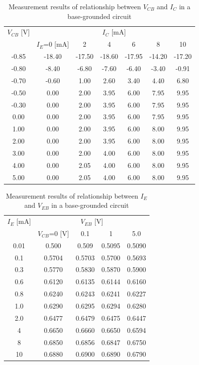 \documentclass[a4paper,10pt]{jsarticle}
\begin{document}
\begin{table}[H]
  \centering
  \caption{Measurement results of relationship between $V_{CB}$ and $I_C$ in a base-grounded circuit}
    \begin{tabular}{ccccccc}
    $V_{CB}$ [V] & \multicolumn{6}{c}{$I_C$ [mA]} \\
          & $I_E$=0 [mA] & 2     & 4     & 6     & 8     & 10 \\
    \midrule
    \midrule
    -0.85 & -18.40 & -17.50 & -18.60 & -17.95 & -14.20 & -17.20 \\
    -0.80 & -8.40 & -6.80 & -7.60 & -6.40 & -3.40 & -0.91 \\
    -0.70 & -0.60 & 1.00  & 2.60  & 3.40  & 4.40  & 6.80 \\
    -0.50 & 0.00  & 2.00  & 3.95  & 6.00  & 7.95  & 9.95 \\
    -0.30 & 0.00  & 2.00  & 3.95  & 6.00  & 7.95  & 9.95 \\
    0.00  & 0.00  & 2.00  & 3.95  & 6.00  & 7.95  & 9.95 \\
    1.00  & 0.00  & 2.00  & 3.95  & 6.00  & 8.00  & 9.95 \\
    2.00  & 0.00  & 2.00  & 3.95  & 6.00  & 8.00  & 9.95 \\
    3.00  & 0.00  & 2.00  & 4.00  & 6.00  & 8.00  & 9.95 \\
    4.00  & 0.00  & 2.05  & 4.00  & 6.00  & 8.00  & 9.95 \\
    5.00  & 0.00  & 2.05  & 4.00  & 6.00  & 8.00  & 9.95 \\
    \end{tabular}%
  \label{tab:addlabel}%
\end{table}%
\begin{table}[H]
  \centering
  \caption{Measurement results of relationship between $I_E$ and $V_{EB}$ in a base-grounded circuit}
    \begin{tabular}{ccccc}
    \multicolumn{1}{l}{$I_E$ [mA]} & \multicolumn{4}{c}{$V_{EB}$ [V]} \\
          & $V_{CB}$=0 [V] & 0.1   & 1     & 5.0 \\
    \midrule
    \midrule
    0.01  & 0.500 & 0.509 & 0.5095 & 0.5090 \\
    0.1   & 0.5704 & 0.5703 & 0.5700 & 0.5693 \\
    0.3   & 0.5770 & 0.5830 & 0.5870 & 0.5900 \\
    0.6   & 0.6120 & 0.6135 & 0.6144 & 0.6160 \\
    0.8   & 0.6240 & 0.6243 & 0.6241 & 0.6227 \\
    1.0   & 0.6290 & 0.6295 & 0.6294 & 0.6280 \\
    2.0   & 0.6477 & 0.6479 & 0.6475 & 0.6447 \\
    4     & 0.6650 & 0.6660 & 0.6650 & 0.6594 \\
    8     & 0.6850 & 0.6856 & 0.6847 & 0.6750 \\
    10    & 0.6880 & 0.6900 & 0.6890 & 0.6790 \\
    \end{tabular}%
  \label{tab:addlabel}%
\end{table}%
\end{document}
